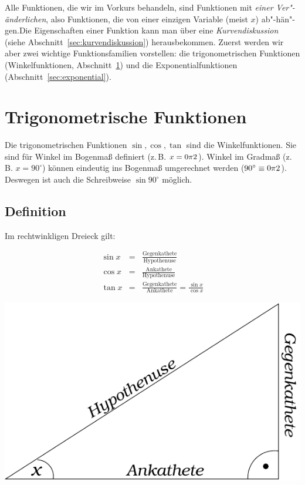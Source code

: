 \noindent Alle Funktionen, die wir im Vorkurs behandeln, sind Funktionen mit \emph{einer Ver"-änderlichen}, also Funktionen, die von einer einzigen Variable (meist $x$) ab"-hän"-gen.Die Eigenschaften einer Funktion kann man über eine \emph{Kurvendiskussion} (siehe Abschnitt~\ref{sec:kurvendiskussion}) herausbekommen. Zuerst werden wir aber zwei wichtige Funktionsfamilien vorstellen: die trigonometrischen Funktionen (Winkelfunktionen, Abschnitt~\ref{sec:trigonometrie}) und die Exponentialfunktionen (Abschnitt~\ref{sec:exponential}).

\section{Trigonometrische Funktionen}
\label{sec:trigonometrie}

Die trigonometrischen Funktionen $\sin, \cos, \tan$ sind die
Winkelfunktionen. Sie sind für Winkel im Bogenmaß definiert (z.\,B. $ x =
\pitwo$). Winkel im Gradmaß (z.\,B. $ x = 90^\circ$) können
eindeutig ins Bogenmaß umgerechnet werden ($90^\circ \equiv \pitwo$).
Deswegen ist auch die Schreibweise $\sin 90^\circ$ möglich.

\subsection{Definition}
Im rechtwinkligen Dreieck gilt:

\begin{minipage}{.5\linewidth}
\begin{eqnarray*}
 \sin x &=& \frac{\text{Gegenkathete}}{\text{Hypothenuse}}\\
 \cos x &=& \frac{\text{Ankathete}}{\text{Hypothenuse}}\\
 \tan x &=& \frac{\text{Gegenkathete}}{\text{Ankathete}} =
\frac{\sin x}{\cos x}
\end{eqnarray*}
\end{minipage}\hspace{.1\linewidth}
\begin{minipage}{.35\textwidth}
 \includegraphics[width=\textwidth]{img/winkel.pdf}
\end{minipage}

